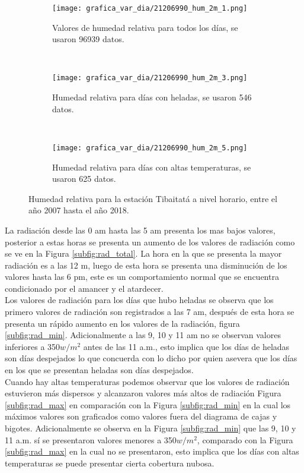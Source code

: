 \begin{figure}[H]
    \centering
    \begin{subfigure}[b]{0.45\textwidth}
       \caption{Valores de humedad relativa para todos los días, se usaron 96939 datos.}
	\texttt{[image: grafica\_var\_dia/21206990\_hum\_2m\_1.png]}
     \label{subfig:hum_total}
	\end{subfigure}
	~
    \begin{subfigure}[b]{0.45\textwidth}
       \caption{Humedad relativa para días con heladas, se usaron 546 datos.}
	\texttt{[image: grafica\_var\_dia/21206990\_hum\_2m\_3.png]}
     \label{subfig:hum_min}
	\end{subfigure}
		~
    \begin{subfigure}[b]{0.45\textwidth}
       \caption{Humedad relativa para días con altas temperaturas, se usaron 625 datos.}
	\texttt{[image: grafica\_var\_dia/21206990\_hum\_2m\_5.png]}
     \label{subfig:hum_max}
	\end{subfigure}
	
    \caption{Humedad relativa para la estación Tibaitatá a nivel horario, entre el año 2007 hasta el año 2018.}
    \label{fig:hr_tibaitata}
\end{figure}


La radiación desde las 0 am hasta las 5 am presenta los mas bajos valores, posterior a estas horas se presenta un aumento de los valores de radiación como se ve en la Figura \ref{subfig:rad_total}. La hora en la que se presenta la mayor radiación es a las 12 m, luego de esta hora se presenta una disminución de los valores hasta las 6 pm, este es un comportamiento normal que se encuentra condicionado por el amancer y el atardecer.\\

Los valores de radiación para los días que hubo heladas se observa que los primero valores de radiación son registrados a las 7 am, después de esta hora se presenta un rápido aumento en los valores de la radiación, figura \ref{subfig:rad_min}. Adicionalmente a las 9, 10 y 11 am no se observan valores inferiores a 350$w/m^2$ antes de las 11 a.m., esto implica que los días de heladas son días despejados lo que concuerda con lo dicho por \citet{Snyder2005} quien asevera que los días en los que se presentan heladas son días despejados.\\

Cuando hay altas temperaturas podemos observar que los valores de radiación estuvieron más dispersos y alcanzaron valores más altos de radiación Figura \ref{subfig:rad_max} en comparación con la Figura \ref{subfig:rad_min} en la cual los máximos valores son graficados como valores fuera del diagrama de cajas y bigotes. Adicionalmente se observa en la Figura \ref{subfig:rad_min} que las 9, 10 y 11 a.m. sí se presentaron valores menores a 350$w/m^2$, comparado con la Figura \ref{subfig:rad_max} en la cual no se presentaron, esto implica que los días con altas temperaturas se puede presentar cierta cobertura nubosa.\\


